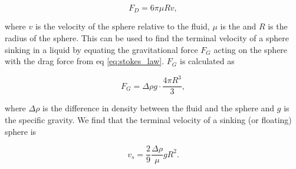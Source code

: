 \begin{equation}\label{eq:stokes_law}
F_D = 6\pi \mu R v,
\end{equation}

\noindent where $v$ is the velocity of the sphere relative to the fluid, $\mu$ is the and $R$ is the radius of the sphere. This can be used to find the terminal velocity of a sphere sinking in a liquid by equating the gravitational force $F_G$ acting on the sphere with the drag force from eq \ref{eq:stokes_law}. $F_G$ is calculated as

\begin{equation}
F_G = \Delta \rho g\cdot \frac{4\pi R^3}{3},
\end{equation}

\noindent where $\Delta \rho$ is the difference in density between the fluid and the sphere and $g$ is the specific gravity. We find that the terminal velocity of a sinking (or floating) sphere is

\begin{equation}\label{eq:fallingSphere}
v_s = \frac{2}{9} \frac{\Delta \rho}{\mu} g R^2.
\end{equation}

